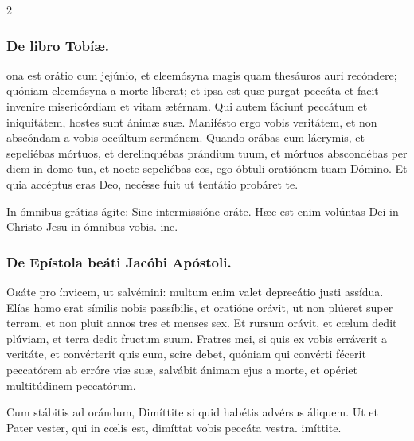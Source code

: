\documentclass[9pt,twoside]{extarticle}
\begin{document}
\begin{multicols}{2}
\subsubsection*{\center De libro Tobíæ.}
\begin{center}\end{center}
ona est orátio cum jejúnio, et eleemósyna magis quam thesáuros auri recóndere; quóniam eleemósyna a morte líberat; et ipsa est quæ purgat peccáta et facit inveníre misericórdiam et vitam ætérnam. Qui autem fáciunt peccátum et iniquitátem, hostes sunt ánimæ suæ. Manifésto ergo vobis veritátem, et non abscóndam a vobis occúltum sermónem. Quando orábas cum lácrymis, et sepeliébas mórtuos, et derelinquébas prándium tuum, et mórtuos abscondébas per diem in domo tua, et nocte sepeliébas eos, ego óbtuli oratiónem tuam Dómino. Et quia accéptus eras Deo, necésse fuit ut tentátio probáret te.

\begin{tightlist}{}
\item {} In ómnibus grátias ágite: \textred{*} Sine intermissióne oráte.  Hæc est enim volúntas Dei in Christo Jesu in ómnibus vobis. ine.
\end{tightlist}

\subsubsection*{\center De Epístola beáti Jacóbi Apóstoli.}
\begin{center} \end{center}
\lettrine{O}ráte pro ínvicem, ut salvémini: multum enim valet deprecátio justi assídua. Elías homo erat símilis nobis passíbilis, et oratióne orávit, ut non plúeret super terram, et non pluit annos tres et menses sex. Et rursum orávit, et cœlum dedit plúviam, et terra dedit fructum suum. Fratres mei, si quis ex vobis erráverit a veritáte, et convérterit quis eum, scire debet, quóniam qui convérti fécerit peccatórem ab erróre viæ suæ, salvábit ánimam ejus a morte, et opériet multitúdinem peccatórum.

\begin{tightlist}{}
\item {} Cum stábitis ad orándum, \textred{*} Dimíttite si quid habétis advérsus áliquem.  Ut et Pater vester, qui in cœlis est, dimíttat vobis peccáta vestra. imíttite.
\end{tightlist}

\end{multicols}
\end{document}
